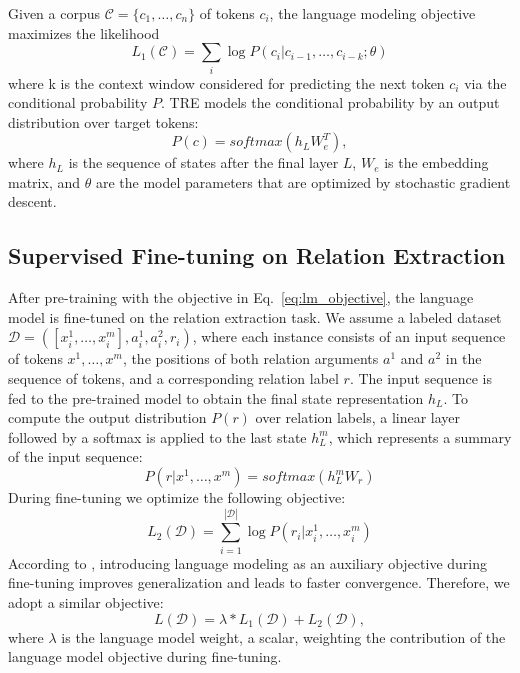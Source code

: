\documentclass[akbc,twoside,11pt]{article}
\begin{document}
Given a corpus $\mathcal{C} = \{c_1, \ldots, c_n\}$ of tokens $c_i$, the language modeling objective maximizes the likelihood
\begin{equation}
    \label{eq:lm_objective}
    L_1(\mathcal{C}) = \sum_i \log P(c_i | c_{i-1}, \ldots, c_{i-k}; \theta)
\end{equation}
where k is the context window considered for predicting the next token $c_i$ via the conditional probability $P$. TRE models the conditional probability by an output distribution over target tokens:
\begin{equation}
    P(c) = softmax(h_L W^T_e),
\end{equation}
where $h_L$ is the sequence of states after the final layer $L$, $W_e$ is the embedding matrix, and $\theta$ are the model parameters that are optimized by stochastic gradient descent.

\subsection{Supervised Fine-tuning on Relation Extraction}
\label{sec:superv_re}
After pre-training with the objective in Eq.~\ref{eq:lm_objective}, the language model is fine-tuned on the relation extraction task. We assume a labeled dataset $\mathcal{D} = ([x_i^1, \ldots, x_i^m], a^1_i, a^2_i, r_i)$, where each instance consists of an input sequence of tokens $x^1, \ldots, x^m$, the positions of both relation arguments $a^1$ and $a^2$ in the sequence of tokens, and a corresponding relation label $r$. The input sequence is fed to the pre-trained model to obtain the final state representation $h_L$. To compute the output distribution $P(r)$ over relation labels, a linear layer followed by a softmax is applied to the last state $h^m_L$, which represents a summary of the input sequence:
\begin{equation}
    P(r | x^1, \ldots, x^m) = softmax(h^m_L W_r)
\end{equation}
During fine-tuning we optimize the following objective:
\begin{equation}
    L_2(\mathcal{D}) = \sum^{|\mathcal{D}|}_{i=1} \log P(r_i | x_i^1, \ldots, x_i^m)
\end{equation}
According to \citet{radford_improvinglu_2018}, introducing language modeling as an auxiliary objective during fine-tuning improves generalization and leads to faster convergence. Therefore, we adopt a similar objective:
\begin{equation}
    L(\mathcal{D}) = \lambda * L_1(\mathcal{D}) + L_2(\mathcal{D}),
\end{equation}
where $\lambda$ is the language model weight, a scalar, weighting the contribution of the language model objective during fine-tuning.
\end{document}
